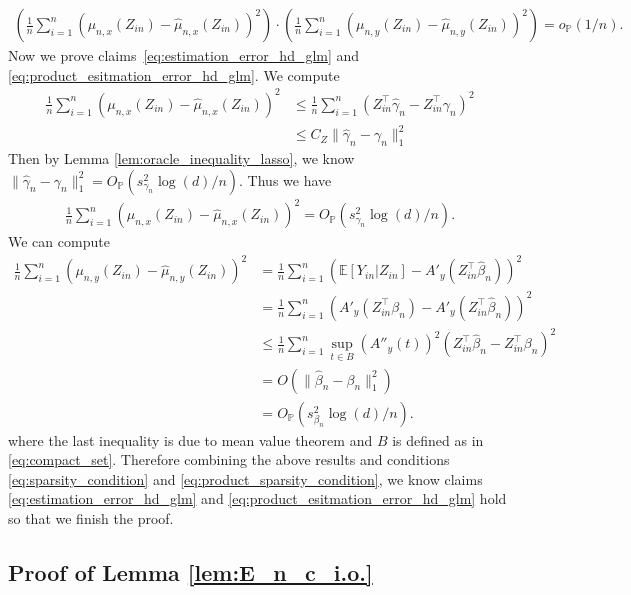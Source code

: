 \documentclass[12pt]{article}
\theoremstyle{definition}
\def\P{\mathbb{P}}
\def\P{\mathbb{P}}
\newcommand{\E}{\mathbb E}								%
\renewcommand{\P}{\mathbb{P}}							%
\newcommand{\srz}{Z}									%
\newcommand{\sry}{Y}									%
\begin{document}
\begin{align}\label{eq:product_esitmation_error_hd_glm}
  \left(\frac{1}{n}\sum_{i=1}^n(\mu_{n,x}(\srz_{in})-\widehat{\mu}_{n,x}(\srz_{in}))^2\right)\cdot\left(\frac{1}{n}\sum_{i=1}^n(\mu_{n,y}(\srz_{in})-\widehat{\mu}_{n,y}(\srz_{in}))^2\right)=o_\P(1/n).
\end{align}
Now we prove claims~\eqref{eq:estimation_error_hd_glm} and \eqref{eq:product_esitmation_error_hd_glm}. We compute 
\begin{align*}
  \frac{1}{n}\sum_{i=1}^n(\mu_{n,x}(\srz_{in})-\widehat{\mu}_{n,x}(\srz_{in}))^2
  &
  \leq \frac{1}{n}\sum_{i=1}^n(\srz_{in}^\top \widehat\gamma_n-\srz_{in}^\top\gamma_n)^2\tag{Lipschitz property}\\
  &
  \leq C_Z\|\widehat\gamma_n-\gamma_n\|_1^2\tag{H\"older's inequality}
\end{align*}
Then by Lemma \ref{lem:oracle_inequality_lasso}, we know $\|\widehat\gamma_n-\gamma_n\|_1^2=O_\P(s_{\gamma_n}^2\log(d)/n)$. Thus we have 
\begin{align*}
  \frac{1}{n}\sum_{i=1}^n(\mu_{n,x}(\srz_{in})-\widehat{\mu}_{n,x}(\srz_{in}))^2=O_\P(s_{\gamma_n}^2\log(d)/n).
\end{align*}
We can compute 
\begin{align*}
  \frac{1}{n}\sum_{i=1}^n(\mu_{n,y}(\srz_{in})-\widehat{\mu}_{n,y}(\srz_{in}))^2
  &
  =\frac{1}{n}\sum_{i=1}^n (\E[\sry_{in}|\srz_{in}]-A'_y(\srz_{in}^\top \widehat\beta_n))^2\\
  &
  = \frac{1}{n}\sum_{i=1}^n(A'_y(\srz_{in}^\top\beta_n)-A'_y(\srz_{in}^\top\widehat\beta_n))^2\\
  &
  \leq \frac{1}{n}\sum_{i=1}^n \sup_{t\in B}(A''_y(t))^2(\srz_{in}^\top \widehat\beta_n-\srz_{in}^\top \beta_n)^2\\
  &
  =O(\|\widehat{\beta}_n-\beta_n\|_1^2)\\
  &
  =O_\P(s_{\beta_n}^2\log(d)/n).
\end{align*}
where the last inequality is due to mean value theorem and $B$ is defined as in \eqref{eq:compact_set}. Therefore combining the above results and conditions \eqref{eq:sparsity_condition} and \eqref{eq:product_sparsity_condition}, we know claims \eqref{eq:estimation_error_hd_glm} and \eqref{eq:product_esitmation_error_hd_glm} hold so that we finish the proof.

\subsection{Proof of Lemma \ref{lem:E_n_c_i.o.}}\label{sec:proof_E_n_c_i.o.}
\end{document}

